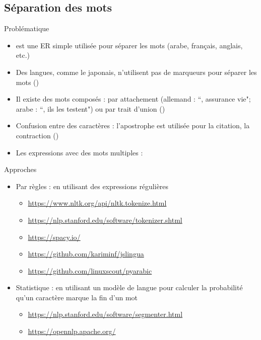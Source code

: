 \documentclass{KodeBook}
\begin{document}
\subsection{Séparation des mots}

Problématique
\begin{itemize}
	\item \expword{/[ ]+/} est une ER simple utilisée pour séparer les mots (arabe, français, anglais, etc.)
	\item Des langues, comme le japonais, n'utilisent pas de marqueurs pour séparer les mots ()
	\item Il existe des mots composés : par attachement (allemand : ``, assurance vie"; arabe : ``, ils les testent") ou par trait d'union ()
	\item Confusion entre des caractères : l'apostrophe est utilisée pour la citation, la contraction () 
	\item Les expressions avec des mots multiples : 
\end{itemize}

Approches
\begin{itemize}
	\item Par règles : en utilisant des expressions régulières 
	\begin{itemize}
		\item \url{https://www.nltk.org/api/nltk.tokenize.html}
		\item \url{https://nlp.stanford.edu/software/tokenizer.shtml}
		\item \url{https://spacy.io/}
		\item \url{https://github.com/kariminf/jslingua}
		\item \url{https://github.com/linuxscout/pyarabic}
	\end{itemize}
	\item Statistique : en utilisant un modèle de langue pour calculer la probabilité qu'un caractère marque la  fin d'un mot 
	\begin{itemize}
		\item \url{https://nlp.stanford.edu/software/segmenter.html}
		\item \url{https://opennlp.apache.org/}
	\end{itemize}
\end{itemize}

\end{document}
